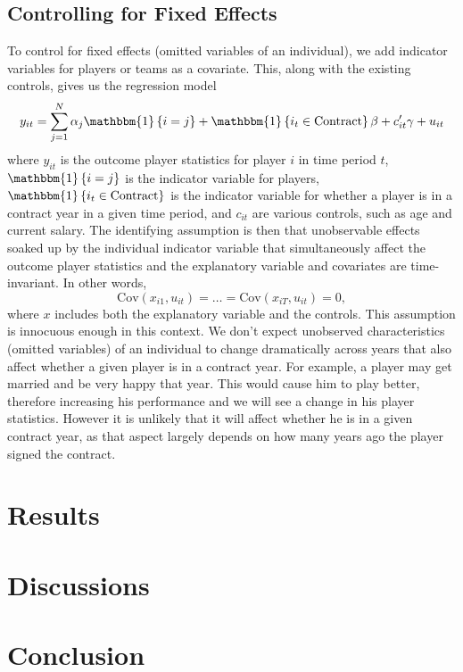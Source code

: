 \documentclass[12pt]{article}
\begin{document}
	\subsection{Controlling for Fixed Effects}
	
	To control for fixed effects (omitted variables of an individual), we add indicator variables for players or teams as a covariate. This, along with the existing controls, gives us the regression model \[
	y_{it} = \sum_{j=1}^N \alpha_j \mathbbm{1}\left\lbrace i= j \right\rbrace + \mathbbm{1}\left\lbrace i_t\in \mathrm{Contract} \right\rbrace\beta + c_{it}'\gamma + u_{it}
	\] where $y_{it}$ is the outcome player statistics for player $i$ in time period $t$, $\mathbbm{1}\left\lbrace i= j \right\rbrace$ is the indicator variable for players, $\mathbbm{1}\left\lbrace i_t\in \mathrm{Contract} \right\rbrace$ is the indicator variable for whether a player is in a contract year in a given time period, and $c_{it}$ are various controls, such as age and current salary. The identifying assumption is then that unobservable effects soaked up by the individual indicator variable that simultaneously affect the outcome player statistics and the explanatory variable and covariates are time-invariant. In other words, \[
	\mathrm{Cov}\left(x_{i1}, u_{it}\right) = \dots = \mathrm{Cov}\left(x_{iT}, u_{it}\right) = 0,
	\] where $x$ includes both the explanatory variable and the controls. This assumption is innocuous enough in this context. We don't expect unobserved characteristics (omitted variables) of an individual to change dramatically across years that also affect whether a given player is in a contract year. For example, a player may get married and be very happy that year. This would cause him to play better, therefore increasing his performance and we will see a change in his player statistics. However it is unlikely that it will affect whether he is in a given contract year, as that aspect largely depends on how many years ago the player signed the contract.
	
	\section{Results} \label{sec:result}
	
	\section{Discussions} \label{sec:discussion}
	
	\section{Conclusion} \label{sec:conclusion}
	
\end{document}
